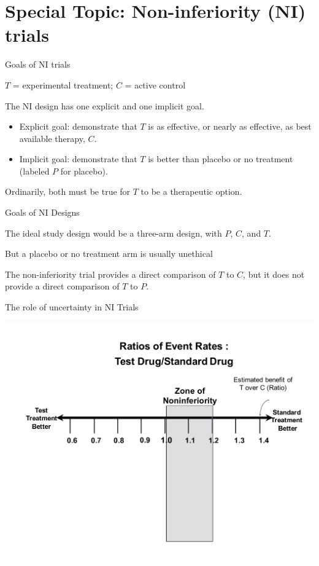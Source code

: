 \documentclass[ignorenonframetext,]{beamer}
\providecommand{\tightlist}{%
\setlength{\itemsep}{0pt}\setlength{\parskip}{0pt}}
\begin{document}
\section{Special Topic: Non-inferiority (NI)
trials}\label{special-topic-non-inferiority-ni-trials}

\begin{frame}{Goals of NI trials}

\(T\) = experimental treatment; \(C\) = active control

The NI design has one explicit and one implicit goal.

\begin{itemize}
\tightlist
\item
  Explicit goal: demonstrate that \(T\) is as effective, or nearly as
  effective, as best available therapy, \(C\).\\
\item
  Implicit goal: demonstrate that \(T\) is better than placebo or no
  treatment (labeled \(P\) for placebo).
\end{itemize}

Ordinarily, both must be true for \(T\) to be a therapeutic option.

\end{frame}

\begin{frame}{Goals of NI Designs}

The ideal study design would be a three-arm design, with \(P\), \(C\),
and \(T\).

But a placebo or no treatment arm is usually unethical

The non-inferiority trial provides a direct comparison of \(T\) to
\(C\), but it does not provide a direct comparison of \(T\) to \(P\).

\end{frame}

\begin{frame}{The role of uncertainty in NI Trials}

\includegraphics{ni_ci_rr_empty.pdf}

\end{frame}
\end{document}

